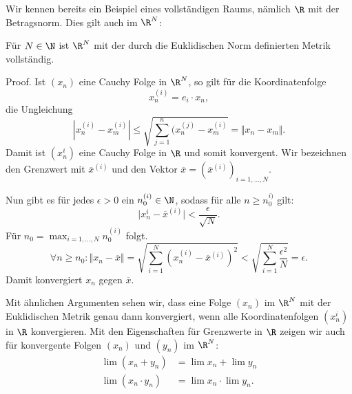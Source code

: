 \documentclass[letterpaper,10pt,english]{jupyterBook}
\begin{document}
Wir kennen bereits ein Beispiel eines vollständigen Raums, nämlich \(\R\) mit der Betragsnorm. Dies gilt auch im \(\R^N\):
\label{metrik/konvfolgen:theorem-8}
\begin{theorem}{}{}



Für \(N \in \N\) ist \(\R^N\) mit der durch die Euklidischen Norm definierten Metrik vollständig.
\end{theorem}

\begin{emphBox}{}{}
Proof.  Ist \((x_n)\) eine Cauchy Folge in \(\R^N\), so gilt für die Koordinatenfolge
\begin{equation*}
 x_n^{(i)} = e_i \cdot x_n,
\end{equation*}
die Ungleichung
\begin{equation*}
 | x_n^{(i)} -  x_m^{(i)}  | \leq \sqrt{ \sum_{j=1}^n (x_n^{(j)} -  x_m^{(i)} } = \Vert x_n - x_m \Vert .
\end{equation*}
Damit ist \((x_n^{i})\) eine Cauchy Folge in \(\R\) und somit konvergent. Wir bezeichnen den Grenzwert mit \(\overline{x}^{(i)}\) und den Vektor
\(\overline{x}=(\overline{x}^{(i)})_{i=1,\ldots,N}\).

Nun gibt es für jedes \(\epsilon > 0\) ein \(n_0^{(i)} \in \N\), sodass für alle \( n \geq n_0^{i)}\) gilt:
\begin{equation*}
 \vert x_n^{i} -\overline{x}^{(i)} \vert < \frac{\epsilon}{\sqrt{N}}.
\end{equation*}
Für \(n_0 = \max_{i=1,\ldots,N} n_0^{(i)}\) folgt.
\begin{equation*}
 \forall n \geq n_0: \Vert x_n - \overline{x} \Vert = \sqrt{\sum_{i=1}^N (x_n^{(i)} - \overline{x}^{(i)})^2} < \sqrt{\sum_{i=1}^N \frac{\epsilon^2}N} = \epsilon.
\end{equation*}
Damit konvergiert \(x_n\) gegen \(\overline{x}\).
\end{emphBox}

Mit ähnlichen Argumenten sehen wir, dass eine Folge \((x_n)\) im \(\R^N\) mit der Euklidischen Metrik genau dann konvergiert, wenn alle Koordinatenfolgen \((x_n^{i})\) in \(\R\) konvergieren. Mit den Eigenschaften für Grenzwerte in \(\R\) zeigen wir auch für konvergente Folgen \((x_n)\) und \((y_n)\) im \(\R^N\):
\begin{align*}
\lim (x_n + y_n) &= \lim x_n + \lim y_n \\
\lim (x_n \cdot y_n) &= \lim x_n \cdot \lim y_n.
\end{align*}
\end{document}
